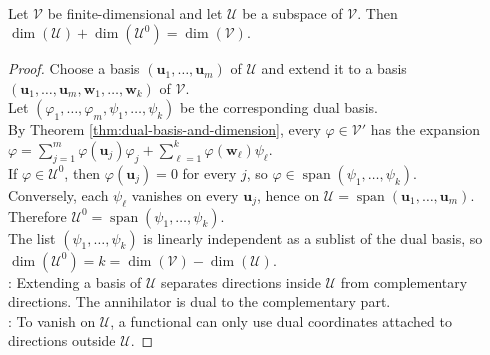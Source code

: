 \begin{theorem} \label{thm:dimension-of-annihilator} \\
Let $\mathcal{V}$ be finite-dimensional and let $\mathcal{U}$ be a subspace of $\mathcal{V}$. Then $\dim(\mathcal{U})+\dim(\mathcal{U}^0)=\dim(\mathcal{V})$.
\begin{proof}
Choose a basis $(\mathbf{u}_1,\ldots,\mathbf{u}_m)$ of $\mathcal{U}$ and extend it to a basis $(\mathbf{u}_1,\ldots,\mathbf{u}_m,\mathbf{w}_1,\ldots,\mathbf{w}_k)$ of $\mathcal{V}$.\\
Let $(\varphi_1,\ldots,\varphi_m,\psi_1,\ldots,\psi_k)$ be the corresponding dual basis.\\
By Theorem \ref{thm:dual-basis-and-dimension}, every $\varphi\in\mathcal{V}'$ has the expansion $\varphi=\sum\limits_{j=1}^m \varphi(\mathbf{u}_j)\varphi_j+\sum\limits_{\ell=1}^k \varphi(\mathbf{w}_\ell)\psi_\ell$.\\
If $\varphi\in\mathcal{U}^0$, then $\varphi(\mathbf{u}_j)=0$ for every $j$, so $\varphi\in\operatorname{span}(\psi_1,\ldots,\psi_k)$.\\
Conversely, each $\psi_\ell$ vanishes on every $\mathbf{u}_j$, hence on $\mathcal{U}=\operatorname{span}(\mathbf{u}_1,\ldots,\mathbf{u}_m)$. Therefore $\mathcal{U}^0=\operatorname{span}(\psi_1,\ldots,\psi_k)$.\\
The list $(\psi_1,\ldots,\psi_k)$ is linearly independent as a sublist of the dual basis, so $\dim(\mathcal{U}^0)=k=\dim(\mathcal{V})-\dim(\mathcal{U})$.\\
: Extending a basis of $\mathcal{U}$ separates directions inside $\mathcal{U}$ from complementary directions. The annihilator is dual to the complementary part.\\
: To vanish on $\mathcal{U}$, a functional can only use dual coordinates attached to directions outside $\mathcal{U}$.
\end{proof}
\end{theorem}

